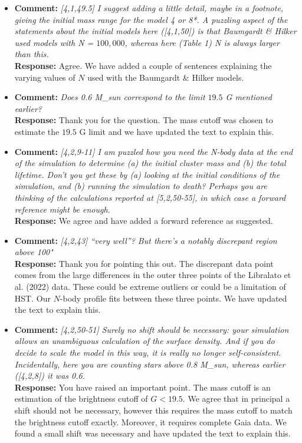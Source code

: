 \documentclass[aps,prl,reprint,showpacs,floatfix,superscriptaddress, onecolumn, 12pt]{revtex4-2}
\begin{document}
\begin{itemize}
    \item
    \textbf{Comment:} \textit{[4,1,49.5] I suggest adding a little detail, maybe in a footnote,
giving the initial mass range for the model 4 or 8*. A puzzling
aspect of the statements about the initial models here ([4,1,50]) is
that Baumgardt \& Hilker used models with N = $100,000$, whereas here (Table 1) N is always larger than this.}\\
    \textbf{Response:} Agree. We have added a couple of sentences explaining the varying values of $N$ used with the Baumgardt \& Hilker models.

    \item
    \textbf{Comment:} \textit{Does 0.6 M\_sun correspond to the limit $19.5$ G mentioned
earlier?}\\
    \textbf{Response:} Thank you for the question. The mass cutoff was chosen to estimate the $19.5$ G limit and we have updated the text to explain this.

    \item
    \textbf{Comment:} \textit{[4,2,9-11] I am puzzled how you need the N-body data at the end of the
simulation to determine (a) the initial cluster mass and (b) the total lifetime.
Don't you get these by (a) looking at the initial conditions of the
simulation, and (b) running the simulation to death? Perhaps you are
thinking of the calculations reported at [5,2,50-55], in which case a
forward reference might be enough.}\\
    \textbf{Response:} We agree and have added a forward reference as suggested.

    \item
    \textbf{Comment:} \textit{[4,2,43] ``very well''? But there's a notably discrepant region above
100"}\\
    \textbf{Response:} Thank you for pointing this out. The discrepant data point comes from the large differences in the outer three points of the Libralato et al. (2022) data. These could be extreme outliers or could be a limitation of HST. Our $N$-body profile fits between these three points.  We have updated the text to explain this.

    \item
    \textbf{Comment:} \textit{[4,2,50-51] Surely no shift should be necessary: your simulation
allows an unambiguous calculation of the surface density. And if you
do decide to scale the model in this way, it is really no longer
self-consistent. Incidentally, here you are counting stars above 0.8
M\_sun, whereas earlier ([4,2,8]) it was 0.6.}\\
    \textbf{Response:} You have raised an important point. The mass cutoff is an estimation of the brightness cutoff of $G<19.5$. We agree that in principal a shift should not be necessary, however this requires the mass cutoff to match the brightness cutoff exactly. Moreover, it requires complete Gaia data. We found a small shift was necessary and have updated the text to explain this.


\end{itemize}
\end{document}
